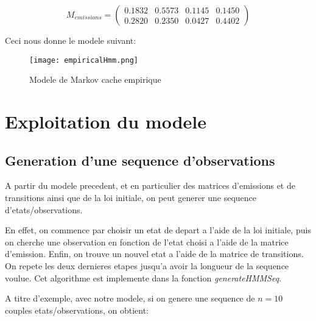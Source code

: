 \documentclass{article}
\begin{document}
\begin{multicols}{2}
\begin{equation}
    M_{emissions} =
    \begin{pmatrix*}
        0.1832 & 0.5573 & 0.1145 & 0.1450 \\
        0.2820 & 0.2350 & 0.0427 & 0.4402
    \end{pmatrix*}
\end{equation}

Ceci nous donne le modele suivant:

\begin{figure}[H]
    \begin{center}
        \texttt{[image: empiricalHmm.png]}
        \centering
        \captionsetup{justification=centering}
        \caption{\label{fig:empiricalHmm}Modele de Markov cache empirique}
    \end{center}
\end{figure}

\section{Exploitation du modele}\label{sec:exploit}

\subsection{Generation d'une sequence d'observations}

A partir du modele precedent, et en particulier des matrices d'emissions et de
transitions ainsi que de la loi initiale, on peut generer une sequence
d'etats/observations.

En effet, on commence par choisir un etat de depart a l'aide de la loi initiale,
puis on cherche une observation en fonction de l'etat choisi a l'aide de la
matrice d'emission. Enfin, on trouve un nouvel etat a l'aide de la matrice de
transitions. On repete les deux dernieres etapes jusqu'a avoir la longueur de la
sequence voulue. Cet algorithme est implemente dans la fonction
\emph{generateHMMSeq}.

A titre d'exemple, avec notre modele, si on genere une sequence de $n = 10$
couples etats/observations, on obtient:


\end{multicols}
\end{document}
